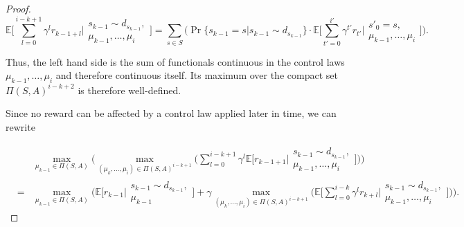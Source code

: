 \documentclass[11pt]{article} %
\begin{document}
\begin{proof}
\begin{equation}
	\mathbb{E} \Big[ \sum\limits_{l=0}^{i-k+1} \gamma^l r_{k-1+l} \Big| \begin{array}{c}
																			s_{k-1} \sim d_{s_{k-1}}, \\
																			\mu_{k-1},\dots,\mu_i
																		\end{array} \Big]  = \sum\limits_{s \in S} \Big( \Pr\{ s_{k-1} = s | s_{k-1} \sim d_{s_{k-1}}\} \cdot \mathbb{E} \Big[ \sum\limits_{t'=0}^{i'} \gamma^{t'} r_{t'} \Big| \begin{array}{c}
																			s'_0 = s, \\
																			\mu_{k-1},\dots,\mu_i
																		\end{array} \Big] \Big).
\end{equation}

Thus, the left hand side is the sum of functionals continuous in the control laws $\mu_{k-1},\dots,\mu_i$ and therefore continuous itself. Its maximum over the compact set $\Pi(S,A)^{i-k+2}$ is therefore well-defined.

Since no reward can be affected by a control law applied later in time, we can rewrite

\begin{equation}
	\begin{array}{rcl}
		& 	 &	\max\limits_{\mu_{k-1} \in \Pi(S,A)} \Big( \max\limits_{(\mu_k,\dots,\mu_i) \in \Pi(S,A)^{i-k+1}} \Big( \sum\limits_{l=0}^{i-k+1} \gamma^l \mathbb{E}\Big[ r_{k-1+1} \Big| 	\begin{array}{c}
																																																s_{k-1} \sim d_{s_{k-1}}, \\
																																																\mu_{k-1},\dots,\mu_i
																																															\end{array} \Big] \Big) \Big) \\
		& =	&	\max\limits_{\mu_{k-1} \in \Pi(S,A)} \Big( \mathbb{E}\Big[ r_{k-1} \Big| \begin{array}{c}
																						s_{k-1} \sim d_{s_{k-1}}, \\
																						\mu_{k-1}
																					\end{array} \Big]  + \gamma \max\limits_{(\mu_k,\dots,\mu_i) \in \Pi(S,A)^{i-k+1}} \Big( \mathbb{E} \Big[ \sum\limits_{l=0}^{i-k} \gamma^l r_{k+l} \Big| \begin{array}{c}
																																																s_{k-1} \sim d_{s_{k-1}}, \\
																																																\mu_{k-1},\dots,\mu_i
																																															\end{array} \Big] \Big) \Big).
	\end{array}
\end{equation}


\end{proof}
\end{document}

